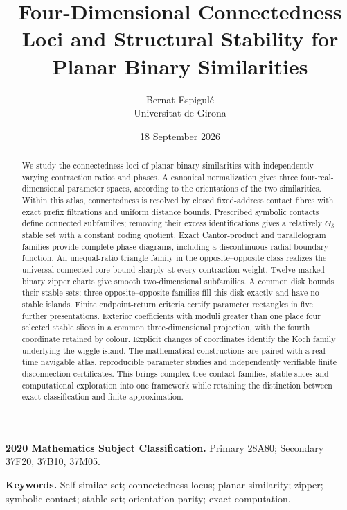 \documentclass[11pt,a4paper]{article}
\title{\vspace{-1.2em}\textbf{Four-Dimensional Connectedness Loci and Structural Stability for Planar Binary Similarities}}
\author{Bernat Espigul\'e\\[.3em]\small Universitat de Girona}
\date{18 September 2026}
\theoremstyle{plain}
\theoremstyle{definition}
\theoremstyle{remark}
\begin{document}
\maketitle
\begin{abstract}
We study the connectedness loci of planar binary similarities with independently
varying contraction ratios and phases. A canonical normalization gives three
four-real-dimensional parameter spaces, according to the orientations of the
two similarities. Within this atlas, connectedness is resolved by closed
fixed-address contact fibres with exact prefix filtrations and uniform distance
bounds. Prescribed symbolic contacts define connected subfamilies; removing
their excess identifications gives a relatively $G_\delta$ stable set with a
constant coding quotient. Exact Cantor-product and parallelogram families
provide complete phase diagrams, including a discontinuous radial boundary
function. An unequal-ratio triangle family in the opposite--opposite class realizes the universal connected-core bound sharply at every contraction weight. Twelve marked binary zipper charts give smooth two-dimensional subfamilies.
A common disk bounds their stable sets; three opposite--opposite families fill
this disk exactly and have no stable islands. Finite endpoint-return criteria
certify parameter rectangles in five further presentations. Exterior coefficients
with moduli greater than one place four selected stable slices in a common
three-dimensional projection, with the fourth coordinate retained by colour.
Explicit changes of coordinates identify the Koch family underlying the wiggle island. The mathematical constructions are paired
with a real-time navigable atlas, reproducible parameter studies and independently
verifiable finite disconnection certificates. This brings complex-tree contact
families, stable slices and computational exploration into one framework while
retaining the distinction between exact classification and finite approximation.
\end{abstract}
\noindent\textbf{2020 Mathematics Subject Classification.}
Primary 28A80; Secondary 37F20, 37B10, 37M05.
\par\noindent\textbf{Keywords.}
Self-similar set; connectedness locus; planar similarity; zipper; symbolic contact;
stable set; orientation parity; exact computation.
\end{document}
